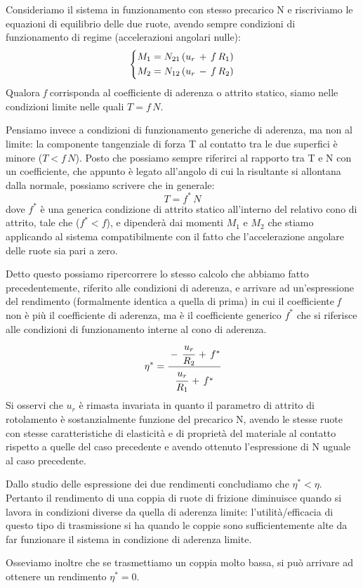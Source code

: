 Consideriamo il sistema in funzionamento con stesso precarico N e riscriviamo le equazioni di equilibrio delle due ruote, avendo sempre condizioni di funzionamento di regime (accelerazioni angolari nulle):
\[
\begin{dcases}
M_1 = N_{21}\,(u_r\,+\,f\,R_1)\\
M_2 = N_{12}\,(u_r\,-\,f\,R_2)
\end{dcases}
\]
Qualora \emph{f} corrisponda al coefficiente di aderenza o attrito statico, siamo nelle condizioni limite nelle quali $T = f\,N$.

Pensiamo invece a condizioni di funzionamento generiche di aderenza, ma non al limite: la componente tangenziale di forza T al contatto tra le due superfici è minore ($T < f\,N$). Posto che possiamo sempre riferirci al rapporto tra T e N con un coefficiente, che appunto è legato all'angolo di cui la risultante si allontana dalla normale, possiamo scrivere che in generale:
\[T = f^*\,N\]
dove $f^*$ è una generica condizione di attrito statico all'interno del relativo cono di attrito, tale che ($f^* < f$), e dipenderà dai momenti $M_1$ e $M_2$ che stiamo applicando al sistema compatibilmente con il fatto che l'accelerazione angolare delle ruote sia pari a zero.

Detto questo possiamo ripercorrere lo stesso calcolo che abbiamo fatto precedentemente, riferito alle condizioni di aderenza, e arrivare ad un'espressione del rendimento (formalmente identica a quella di prima) in cui il coefficiente \emph{f} non è più il coefficiente di aderenza, ma è il coefficiente generico $f^*$ che si riferisce alle condizioni di funzionamento interne al cono di aderenza.
\[\eta^* = \cfrac{-\,\cfrac{u_r}{R_2}\,+\,f^*}{\cfrac{u_r}{R_1}\,+\,f^*}\]
Si osservi che $u_r$ è rimasta invariata in quanto il parametro di attrito di rotolamento è sostanzialmente funzione del precarico N, avendo le stesse ruote con stesse caratteristiche di elasticità e di proprietà del materiale al contatto rispetto a quelle del caso precedente e avendo ottenuto l'espressione di N uguale al caso precedente.

Dallo studio delle espressione dei due rendimenti concludiamo che $\eta^* < \eta$. Pertanto il rendimento di una coppia di ruote di frizione diminuisce quando si lavora in condizioni diverse da quella di aderenza limite: l'utilità/efficacia di questo tipo di trasmissione si ha quando le coppie sono sufficientemente alte da far funzionare il sistema in condizione di aderenza limite.

Osseviamo inoltre che se trasmettiamo un coppia molto bassa, si può arrivare ad ottenere un rendimento $\eta^* = 0$.

